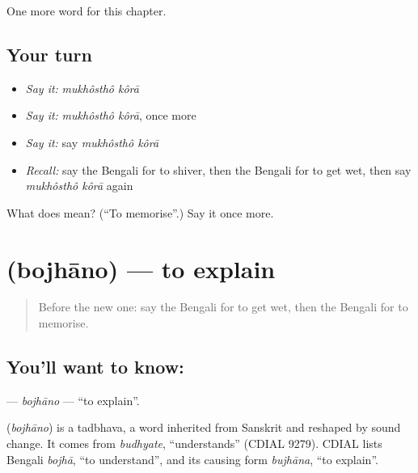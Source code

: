 \begin{grammarlens}[title={What you've built}]
One more word for this chapter.
\end{grammarlens}

\subsection*{Your turn}
\begin{itemize}
\raggedright
  \item \emph{Say it:} \emph{mukhôsthô kôrā}
  \item \emph{Say it:} \emph{mukhôsthô kôrā}, once more
  \item \emph{Say it:} say \emph{mukhôsthô kôrā}
  \item \emph{Recall:} say the Bengali for to shiver, then the Bengali for to get wet, then say \emph{mukhôsthô kôrā} again
\end{itemize}

\begin{tcolorbox}[breakable,colback=teal!4,colframe=teal!35!black,title={Before you move on}]
What does   mean? (\textquotedblleft{}To memorise\textquotedblright{}.) Say it once more.
\end{tcolorbox}
\section[\texorpdfstring{\bn{বোঝানো} (bojhāno)}{বোঝানো (bojhāno)}]{ (bojhāno) — to explain}

\label{lesson:BN-C181-bojhano}



\begin{quote}
Before the new one: say the Bengali for to get wet, then the Bengali for to memorise.
\end{quote}

\subsection*{You'll want to know: }
\textbf{} — \emph{bojhāno} — \textquotedblleft{}to explain\textquotedblright{}.

\begin{cousinweb}
\textbf{} (\emph{bojhāno}) is a tadbhava, a word inherited from Sanskrit and reshaped by sound change. It comes from \emph{budhyate}, \textquotedblleft{}understands\textquotedblright{} (CDIAL 9279). CDIAL lists Bengali \emph{bojhā}, \textquotedblleft{}to understand\textquotedblright{}, and its causing form \emph{bujhāna}, \textquotedblleft{}to explain\textquotedblright{}.
\end{cousinweb}

